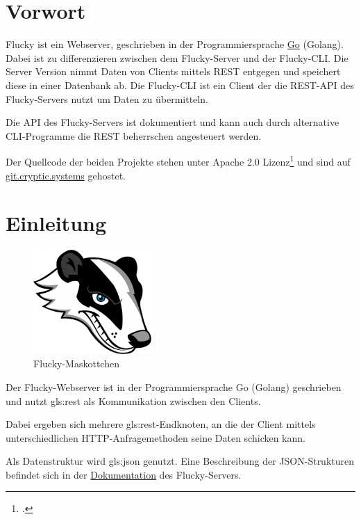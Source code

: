 \section{Vorwort}%
\label{sec:vorwort}
Flucky ist ein Webserver, geschrieben in der Programmiersprache \href{https://golang.org/}{Go} (Golang). Dabei ist zu differenzieren zwischen dem Flucky-Server und der Flucky-CLI. Die Server Version nimmt Daten von Clients mittels REST entgegen und speichert diese in einer Datenbank ab. Die Flucky-CLI ist ein Client der die REST-API des Flucky-Servers nutzt um Daten zu übermitteln.

Die API des Flucky-Servers ist dokumentiert und kann auch durch alternative CLI-Programme die REST beherrschen angesteuert werden.

Der Quellcode der beiden Projekte stehen unter Apache 2.0 Lizenz\footcite{apache-licence} und sind auf \href{https://git.cryptic.systems}{git.cryptic.systems} gehostet.

\section{Einleitung}%
\label{sec:einleitung}

\begin{figure}
  \includegraphics[width=0.4\textwidth]{img/flucky.png}
  \caption{Flucky-Maskottchen}
\end{figure}

Der Flucky-Webserver ist in der Programmiersprache Go (Golang) geschrieben und nutzt \Gls{gls:rest} als Kommunikation zwischen den Clients.

Dabei ergeben sich mehrere \Gls{gls:rest}-Endknoten, an die der Client mittels unterschiedlichen HTTP-Anfragemethoden seine Daten schicken kann.

Als Datenstruktur wird \Gls{gls:json} genutzt. Eine Beschreibung der JSON-Strukturen befindet sich in der \href{https://git.cryptic.systems/fh-trier/go-flucky-server/wiki}{Dokumentation} des Flucky-Servers.

